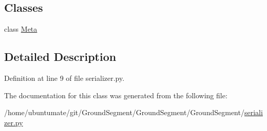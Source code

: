 \subsection*{Classes}
\begin{DoxyCompactItemize}
\item 
class \hyperlink{class_ground_segment_1_1serializer_1_1_d_c_p_data_serializer_1_1_meta}{Meta}
\end{DoxyCompactItemize}


\subsection{Detailed Description}


Definition at line 9 of file serializer.\+py.



The documentation for this class was generated from the following file\+:\begin{DoxyCompactItemize}
\item 
/home/ubuntumate/git/\+Ground\+Segment/\+Ground\+Segment/\+Ground\+Segment/\hyperlink{serializer_8py}{serializer.\+py}\end{DoxyCompactItemize}
